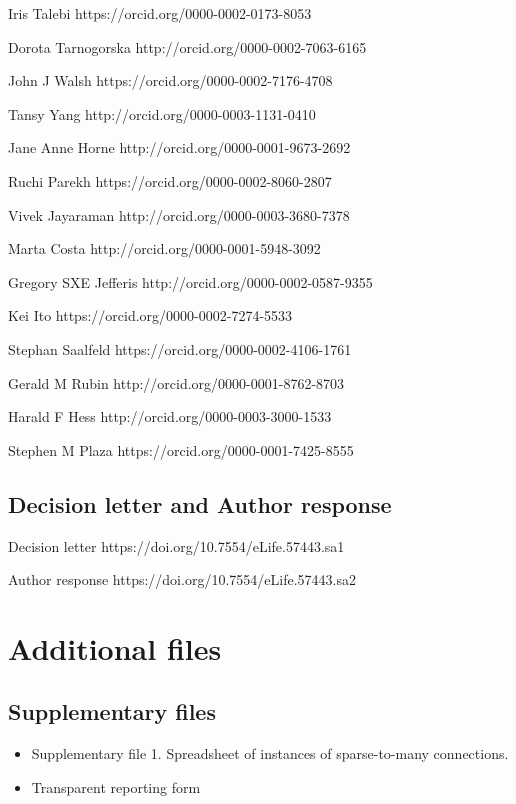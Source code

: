 \documentclass{article}
\begin{document}
\noindent Iris Talebi https://orcid.org/0000-0002-0173-8053\par
\noindent Dorota Tarnogorska http://orcid.org/0000-0002-7063-6165\par
\noindent John J Walsh https://orcid.org/0000-0002-7176-4708\par
\noindent Tansy Yang http://orcid.org/0000-0003-1131-0410\par
\noindent Jane Anne Horne http://orcid.org/0000-0001-9673-2692\par
\noindent Ruchi Parekh https://orcid.org/0000-0002-8060-2807\par
\noindent Vivek Jayaraman http://orcid.org/0000-0003-3680-7378\par
\noindent Marta Costa http://orcid.org/0000-0001-5948-3092\par
\noindent Gregory SXE Jefferis http://orcid.org/0000-0002-0587-9355\par
\noindent Kei Ito https://orcid.org/0000-0002-7274-5533\par
\noindent Stephan Saalfeld https://orcid.org/0000-0002-4106-1761\par
\noindent Gerald M Rubin http://orcid.org/0000-0001-8762-8703\par
\noindent Harald F Hess http://orcid.org/0000-0003-3000-1533\par
\noindent Stephen M Plaza https://orcid.org/0000-0001-7425-8555\par

\subsection*{Decision letter and Author response}

\noindent Decision letter https://doi.org/10.7554/eLife.57443.sa1\par
\noindent Author response https://doi.org/10.7554/eLife.57443.sa2\par

\section*{Additional files}

\subsection*{Supplementary files}

\begin{itemize}
\item Supplementary file 1. Spreadsheet of instances of sparse-to-many connections.
\item Transparent reporting form
\end{itemize}
\end{document}
